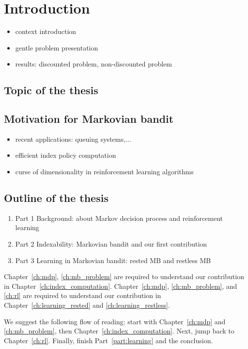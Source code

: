 \chapter{Introduction}
\label{chapter:introduction}

\begin{itemize}
    \item context introduction
    \item gentle problem presentation
    \item results: discounted problem, non-discounted problem
\end{itemize}

\section{Topic of the thesis}

\section{Motivation for Markovian bandit}

\begin{itemize}
    \item recent applications: queuing systems,...
    \item efficient index policy computation
    \item curse of dimensionality in reinforcement learning algorithms
\end{itemize}

\section{Outline of the thesis}

\begin{enumerate}
    \item Part 1 Background: about Markov decision process and reinforcement learning
    \item Part 2 Indexability: Markovian bandit and our first contribution
    \item Part 3 Learning in Markovian bandit: rested MB and restless MB
\end{enumerate}

Chapter~\ref{ch:mdp}, \ref{ch:mb_problem} are required to understand our contribution in Chapter~\ref{ch:index_computation}.
Chapter~\ref{ch:mdp}, \ref{ch:mb_problem}, and \ref{ch:rl} are required to understand our contribution in Chapter~\ref{ch:learning_rested} and \ref{ch:learning_restless}.

We suggest the following flow of reading: start with Chapter~\ref{ch:mdp} and \ref{ch:mb_problem}, then Chapter~\ref{ch:index_computation}. Next, jump back to Chapter~\ref{ch:rl}. Finally, finish Part~\ref{part:learning} and the conclusion.

%
